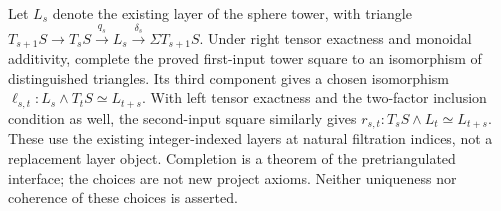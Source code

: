 \begin{definition}
  \label{def:h6-mixed-layer-pairings}
  \leanok
  Let $L_s$ denote the existing layer of the sphere tower, with triangle
  $T_{s+1}S\to T_sS\xrightarrow{q_s}L_s\xrightarrow{\delta_s}\Sigma T_{s+1}S$.
  Under right tensor exactness and monoidal additivity, complete the proved
  first-input tower square to an isomorphism of distinguished triangles.
  Its third component gives a chosen isomorphism
  $\ell_{s,t}:L_s\wedge T_tS\simeq L_{t+s}$.
  With left tensor exactness and the two-factor inclusion condition as well,
  the second-input square similarly gives
  $r_{s,t}:T_sS\wedge L_t\simeq L_{t+s}$.
  These use the existing integer-indexed layers at natural filtration
  indices, not a replacement layer object. Completion is a theorem of the
  pretriangulated interface; the choices are not new project axioms.
  Neither uniqueness nor coherence of these choices is asserted.
\end{definition}

